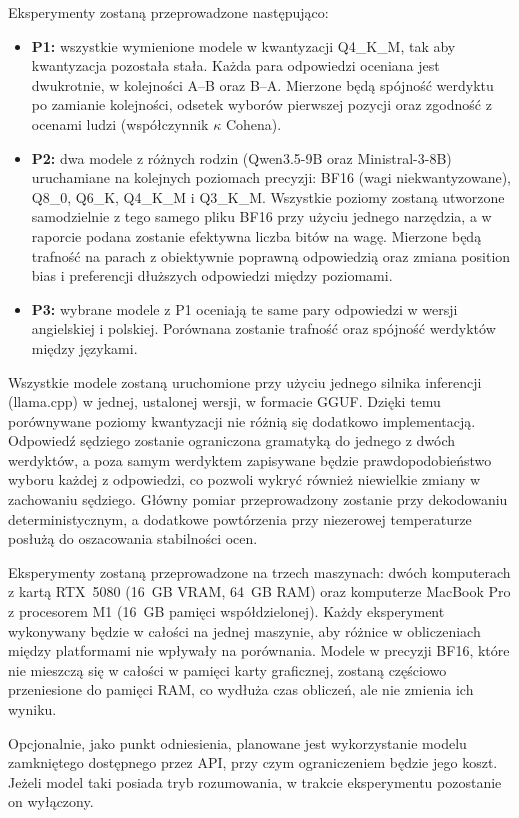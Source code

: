 \documentclass[11pt,a4paper]{article}
\begin{document}
Eksperymenty zostaną przeprowadzone następująco:
\begin{itemize}[leftmargin=1.5em]
  \item \textbf{P1:} wszystkie wymienione modele w kwantyzacji Q4\_K\_M, tak aby kwantyzacja pozostała stała. Każda para odpowiedzi oceniana jest dwukrotnie, w kolejności A--B oraz B--A. Mierzone będą spójność werdyktu po zamianie kolejności, odsetek wyborów pierwszej pozycji oraz zgodność z ocenami ludzi (współczynnik $\kappa$ Cohena).
  \item \textbf{P2:} dwa modele z różnych rodzin (Qwen3.5-9B oraz Ministral-3-8B) uruchamiane na kolejnych poziomach precyzji: BF16 (wagi niekwantyzowane), Q8\_0, Q6\_K, Q4\_K\_M i Q3\_K\_M. Wszystkie poziomy zostaną utworzone samodzielnie z tego samego pliku BF16 przy użyciu jednego narzędzia, a w raporcie podana zostanie efektywna liczba bitów na wagę. Mierzone będą trafność na parach z obiektywnie poprawną odpowiedzią oraz zmiana position bias i preferencji dłuższych odpowiedzi między poziomami.
  \item \textbf{P3:} wybrane modele z P1 oceniają te same pary odpowiedzi w wersji angielskiej i polskiej. Porównana zostanie trafność oraz spójność werdyktów między językami.
\end{itemize}

Wszystkie modele zostaną uruchomione przy użyciu jednego silnika inferencji (llama.cpp) w jednej, ustalonej wersji, w formacie GGUF. Dzięki temu porównywane poziomy kwantyzacji nie różnią się dodatkowo implementacją. Odpowiedź sędziego zostanie ograniczona gramatyką do jednego z dwóch werdyktów, a poza samym werdyktem zapisywane będzie prawdopodobieństwo wyboru każdej z odpowiedzi, co pozwoli wykryć również niewielkie zmiany w zachowaniu sędziego. Główny pomiar przeprowadzony zostanie przy dekodowaniu deterministycznym, a dodatkowe powtórzenia przy niezerowej temperaturze posłużą do oszacowania stabilności ocen.

Eksperymenty zostaną przeprowadzone na trzech maszynach: dwóch komputerach z kartą RTX~5080 (16~GB VRAM, 64~GB RAM) oraz komputerze MacBook Pro z procesorem M1 (16~GB pamięci współdzielonej). Każdy eksperyment wykonywany będzie w całości na jednej maszynie, aby różnice w obliczeniach między platformami nie wpływały na porównania. Modele w precyzji BF16, które nie mieszczą się w całości w pamięci karty graficznej, zostaną częściowo przeniesione do pamięci RAM, co wydłuża czas obliczeń, ale nie zmienia ich wyniku.

Opcjonalnie, jako punkt odniesienia, planowane jest wykorzystanie modelu zamkniętego dostępnego przez API, przy czym ograniczeniem będzie jego koszt. Jeżeli model taki posiada tryb rozumowania, w trakcie eksperymentu pozostanie on wyłączony.
\end{document}
